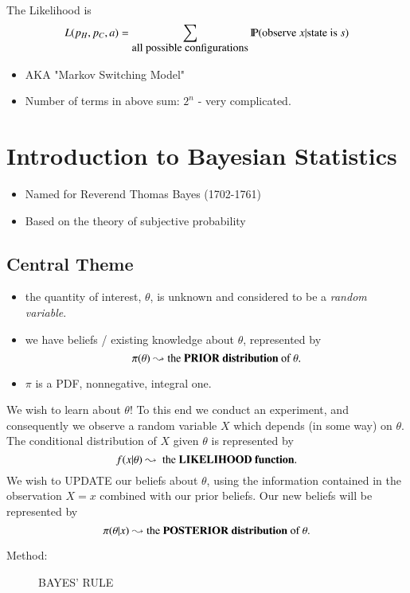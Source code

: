 \documentclass[11pt,english]{scrbook}
\begin{document}
\begin{enumerate}
The Likelihood is
\[
L(p_{H},p_{C},a) = \sum_{\mbox{all possible configurations}}\P(\mbox{observe $x$}|\mbox{state is $s$})
\]
\begin{itemize}
\item AKA "Markov Switching Model"
\item Number of terms in above sum: \(2^{n}\) - very complicated.
\end{itemize}
\end{enumerate}

\section{Introduction to Bayesian Statistics}
\label{sec:org4279831}
\begin{itemize}
\item Named for Reverend Thomas Bayes (1702-1761)
\item Based on the theory of subjective probability
\end{itemize}

\subsection{Central Theme}
\label{sec:orgd7f5037}
\begin{itemize}
\item the quantity of interest, \(\theta\), is unknown and considered to be a \emph{random variable}.
\item we have beliefs / existing knowledge about \(\theta\), represented by
\[
  \pi(\theta) \leadsto \mbox{the \textbf{PRIOR distribution} of $\theta$.}
  \]
\item \(\pi\) is a PDF, nonnegative, integral one.
\end{itemize}
We wish to learn about \(\theta\)! To this end we conduct an experiment, and consequently we observe a random variable \(X\) which depends (in some way) on \(\theta\). The conditional distribution of \(X\) given \(\theta\) is represented by
\[
f(x|\theta) \leadsto \mbox{ the \textbf{LIKELIHOOD function}}.
\]
We wish to UPDATE our beliefs about \(\theta\), using the information contained in the observation \(X=x\) combined with our prior beliefs. Our new beliefs will be represented by
\[
\pi(\theta|x) \leadsto \mbox{the \textbf{POSTERIOR distribution} of $\theta$.}
\]

\begin{description}
\item[{Method:}] BAYES' RULE
\end{description}
\end{document}
